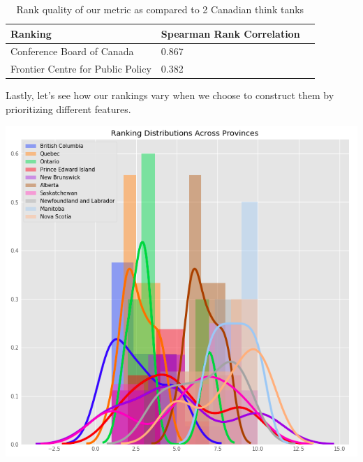 \documentclass[preprint,12pt]{elsarticle}
\begin{document}
\begin{table}[h]
\centering
\begin{tabular}{l l l}
\hline
\textbf{Ranking} & \textbf{Spearman Rank Correlation}\\
\hline
Conference Board of Canada & 0.867 \\
Frontier Centre for Public Policy & 0.382 \\
\hline
\end{tabular}
\caption{Rank quality of our metric as compared to 2 Canadian think tanks}
\end{table}

Lastly, let's see how our rankings vary when we choose to construct them by prioritizing different features.
\begin{center}
\includegraphics[scale=0.3]{images/rankdistributions.png}
\end{center}
\end{document}
